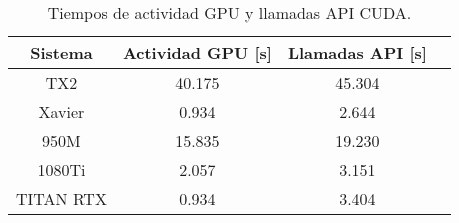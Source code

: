 \begin{table}[]
\centering
\caption{Tiempos de actividad GPU y llamadas API CUDA.}
\begin{tabular}{|c|c|c|c|}
\hline
\textbf{Sistema} & \textbf{Actividad GPU {[}s{]}} & \textbf{Llamadas API {[}s{]}} \\ \hline
TX2              & 40.175                         & 45.304                        \\ \hline
Xavier           & 0.934                          & 2.644                         \\ \hline
950M             & 15.835                         & 19.230                        \\ \hline
1080Ti           & 2.057                          & 3.151                         \\ \hline
TITAN RTX        & 0.934                          & 3.404                         \\ \hline
\end{tabular}
\label{apicalls}
\end{table}